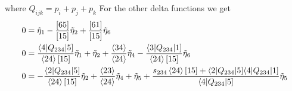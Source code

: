 \documentclass[letter,11pt]{article}
\begin{document}
where $Q_{ijk}=p_i+p_j+p_k$
For the other delta functions we get
\begin{equation}
	\begin{aligned}
	 0&=\tilde\eta_1-\frac{[65]}{[15]}\tilde\eta_2+\frac{[61]}{[15]}\tilde\eta_6\\
		0&= \frac{\langle4|Q_{234}|5]}{\expval{24}[15]}\tilde\eta_1+\tilde\eta_2+\frac{\expval{34}}{\expval{24}}\tilde\eta_4-\frac{\langle3|Q_{234}|1]}{\expval{24}[15]}\tilde\eta_6
		\\
		0&= -\frac{\langle2|Q_{234}|5]}{\expval{24}[15]}\tilde\eta_2+\frac{\expval{23}}{\expval{24}}\tilde\eta_4+\tilde\eta_5+\frac{s_{234}\expval{24}[15]+\langle2|Q_{234}|5]\langle4|Q_{234}|1] }{\langle4|Q_{234}|5]}
\tilde\eta_5
	\end{aligned}
\end{equation}
\end{document}
